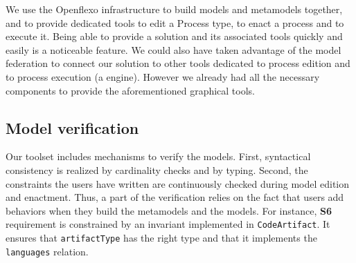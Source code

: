 
We use the Openflexo infrastructure to build models and metamodels together,
and to provide dedicated tools to edit a Process type, to enact a process and
to execute it. Being able to provide a solution and its associated tools
quickly and easily is a noticeable feature.  We could also have taken advantage
of the model federation to connect our solution to other tools dedicated to
process edition and to process execution (\eg a \BPMN engine). However we
already had all the necessary components to provide the aforementioned
graphical tools.

\subsection{Model verification}


Our toolset includes mechanisms to verify the models. First, syntactical
consistency is realized by cardinality checks and by typing. Second, the
constraints the users have written are continuously checked during model
edition and enactment. Thus, a part of the verification relies on the fact that
users add behaviors when they build the metamodels and the models. For
instance, \textbf{S6} requirement is constrained by an invariant implemented in
\texttt{CodeArtifact}. It ensures that \texttt{artifactType} has the right type
and that it implements the \texttt{languages} relation.
